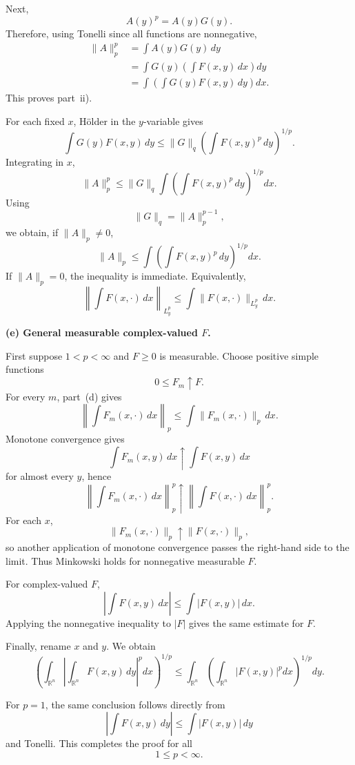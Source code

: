 \begin{solution}
Next,
\[
A(y)^p
=
A(y)G(y).
\]
Therefore, using Tonelli since all functions are nonnegative,
\[
\begin{aligned}
\|A\|_p^p
&=
\int A(y)G(y)\,dy\\
&=
\int
G(y)
\left(
\int F(x,y)\,dx
\right)dy\\
&=
\int
\left(
\int
G(y)F(x,y)\,dy
\right)dx.
\end{aligned}
\]
This proves part~ii).

For each fixed \(x\), Hölder in the \(y\)-variable gives
\[
\int
G(y)F(x,y)\,dy
\le
\|G\|_q
\left(
\int F(x,y)^p\,dy
\right)^{1/p}.
\]
Integrating in \(x\),
\[
\|A\|_p^p
\le
\|G\|_q
\int
\left(
\int F(x,y)^p\,dy
\right)^{1/p}dx.
\]
Using
\[
\|G\|_q=\|A\|_p^{p-1},
\]
we obtain, if \(\|A\|_p\ne0\),
\[
\boxed{
\|A\|_p
\le
\int
\left(
\int F(x,y)^p\,dy
\right)^{1/p}dx.}
\]
If \(\|A\|_p=0\), the inequality is immediate. Equivalently,
\[
\boxed{
\left\|
\int F(x,\cdot)\,dx
\right\|_{L_y^p}
\le
\int
\|F(x,\cdot)\|_{L_y^p}\,dx.}
\]

\par\smallskip\noindent\textbf{(e) General measurable complex-valued \(F\).}

First suppose \(1<p<\infty\) and \(F\ge0\) is measurable. Choose positive
simple functions
\[
0\le F_m\uparrow F.
\]
For every \(m\), part~(d) gives
\[
\left\|
\int F_m(x,\cdot)\,dx
\right\|_p
\le
\int
\|F_m(x,\cdot)\|_p\,dx.
\]
Monotone convergence gives
\[
\int F_m(x,y)\,dx
\uparrow
\int F(x,y)\,dx
\]
for almost every \(y\), hence
\[
\left\|
\int F_m(x,\cdot)\,dx
\right\|_p^p
\uparrow
\left\|
\int F(x,\cdot)\,dx
\right\|_p^p.
\]
For each \(x\),
\[
\|F_m(x,\cdot)\|_p
\uparrow
\|F(x,\cdot)\|_p,
\]
so another application of monotone convergence passes the right-hand side
to the limit. Thus Minkowski holds for nonnegative measurable \(F\).

For complex-valued \(F\),
\[
\left|
\int F(x,y)\,dx
\right|
\le
\int |F(x,y)|\,dx.
\]
Applying the nonnegative inequality to \(|F|\) gives the same estimate for
\(F\).

Finally, rename \(x\) and \(y\). We obtain
\[
\boxed{
\left(
\int_{\mathbb R^n}
\left|
\int_{\mathbb R^n}F(x,y)\,dy
\right|^pdx
\right)^{1/p}
\le
\int_{\mathbb R^n}
\left(
\int_{\mathbb R^n}|F(x,y)|^pdx
\right)^{1/p}dy.}
\]

For \(p=1\), the same conclusion follows directly from
\[
\left|\int F(x,y)\,dy\right|
\le
\int |F(x,y)|\,dy
\]
and Tonelli. This completes the proof for all
\[
1\le p<\infty.
\]
\end{solution}

